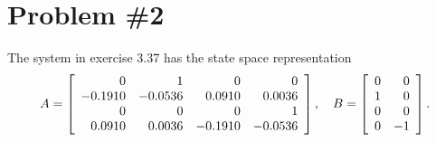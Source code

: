 \documentclass{article}
\begin{document}
\pagebreak

\section*{Problem \#2}
The system in exercise 3.37 has the state space representation
$$
A =
\left[\begin{array}{r r r r}
  0      &       1 &       0 &       0 \\
 -0.1910 & -0.0536 &  0.0910 &  0.0036 \\
       0 &       0 &       0 &       1 \\
  0.0910 &  0.0036 & -0.1910 & -0.0536
\end{array}\right], \quad
B =
\left[\begin{array}{r r}
  0 &  0 \\
  1 &  0 \\
  0 &  0 \\
  0 & -1
\end{array}\right].
$$
\end{document}
